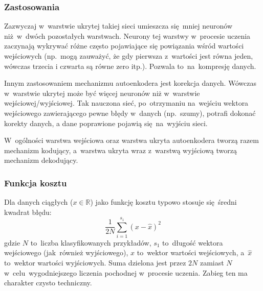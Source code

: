 \subsubsection{Zastosowania}
Zazwyczaj w~warstwie ukrytej takiej sieci umieszcza się~mniej neuronów niż~w~dwóch pozostałych warstwach.
Neurony tej warstwy w~procesie uczenia zaczynają wykrywać różne często pojawiające się powiązania
wśród wartości wejściowych (np.~mogą zauważyć, że gdy pierwsza z~wartości jest równa jeden,
wówczas trzecia i czwarta są równe zero itp.).
Pozwala to~na~kompresję danych.

Innym zastosowaniem mechanizmu autoenkodera jest korekcja danych. Wówczas w~warstwie ukrytej
może być więcej neuronów niż w~warstwie wejściowej/wyjściowej. Tak nauczona sieć, po~otrzymaniu na~wejściu
wektora wejściowego zawierającego pewne błędy w~danych (np.~szumy), potrafi dokonać korekty danych,
a dane poprawione pojawią się~na~wyjściu sieci.

W~ogólności warstwa wejściowa oraz warstwa ukryta autoenkodera tworzą razem mechanizm kodujący, a~warstwa ukryta wraz
z~warstwą wyjściową tworzą mechanizm dekodujący.

\subsubsection{Funkcja kosztu}
Dla danych ciągłych ($x\in\mathbb{R}$) jako funkcję kosztu typowo stosuje się~średni kwadrat błędu:
\begin{equation*}
\frac{1}{2N}\sum\limits_{i=1}^{s_1}(x-\hat{x})^2
\end{equation*}
gdzie $N$ to~liczba klasyfikowanych przykładów, $s_1$ to~długość wektora wejściowego (jak~również wyjściowego),
$x$ to~wektor wartości wejściowych, a~$\hat{x}$ to~wektor wartości wyjściowych. Suma dzielona jest przez $2N$ zamiast
$N$ w~celu~wygodniejszego liczenia pochodnej w~procesie uczenia. Zabieg ten ma charakter czysto techniczny.

